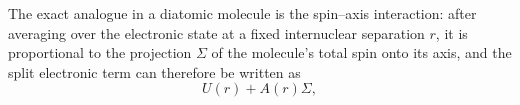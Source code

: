 The exact analogue in a diatomic molecule is the spin--axis interaction: after averaging over the electronic state at a fixed internuclear separation $r$, it is proportional to the projection $\Sigma$ of the molecule's total spin onto its axis, and the split electronic term can therefore be written as
\[
U(r)+A(r)\Sigma,
\]
